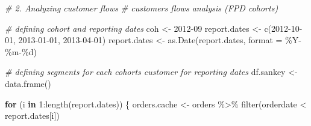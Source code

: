 \documentclass[
]{book}
\newenvironment{Shaded}{\begin{snugshade}}{\end{snugshade}}
\newcommand{\AttributeTok}[1]{\textcolor[rgb]{0.77,0.63,0.00}{#1}}
\newcommand{\CommentTok}[1]{\textcolor[rgb]{0.56,0.35,0.01}{\textit{#1}}}
\newcommand{\ControlFlowTok}[1]{\textcolor[rgb]{0.13,0.29,0.53}{\textbf{#1}}}
\newcommand{\DecValTok}[1]{\textcolor[rgb]{0.00,0.00,0.81}{#1}}
\newcommand{\FunctionTok}[1]{\textcolor[rgb]{0.00,0.00,0.00}{#1}}
\newcommand{\NormalTok}[1]{#1}
\newcommand{\OtherTok}[1]{\textcolor[rgb]{0.56,0.35,0.01}{#1}}
\newcommand{\SpecialCharTok}[1]{\textcolor[rgb]{0.00,0.00,0.00}{#1}}
\newcommand{\StringTok}[1]{\textcolor[rgb]{0.31,0.60,0.02}{#1}}
\begin{document}
\begin{Shaded}
\begin{Highlighting}[]
\CommentTok{\# 2. Analyzing customer flows}
\CommentTok{\# customers flows analysis (FPD cohorts)}

\CommentTok{\# defining cohort and reporting dates}
\NormalTok{coh }\OtherTok{\textless{}{-}} \StringTok{\textquotesingle{}2012{-}09\textquotesingle{}}
\NormalTok{report.dates }\OtherTok{\textless{}{-}} \FunctionTok{c}\NormalTok{(}\StringTok{\textquotesingle{}2012{-}10{-}01\textquotesingle{}}\NormalTok{, }\StringTok{\textquotesingle{}2013{-}01{-}01\textquotesingle{}}\NormalTok{, }\StringTok{\textquotesingle{}2013{-}04{-}01\textquotesingle{}}\NormalTok{)}
\NormalTok{report.dates }\OtherTok{\textless{}{-}} \FunctionTok{as.Date}\NormalTok{(report.dates, }\AttributeTok{format =} \StringTok{\textquotesingle{}\%Y{-}\%m{-}\%d\textquotesingle{}}\NormalTok{)}

\CommentTok{\# defining segments for each cohort\textquotesingle{}s customer for reporting dates}
\NormalTok{df.sankey }\OtherTok{\textless{}{-}} \FunctionTok{data.frame}\NormalTok{()}

\ControlFlowTok{for}\NormalTok{ (i }\ControlFlowTok{in} \DecValTok{1}\SpecialCharTok{:}\FunctionTok{length}\NormalTok{(report.dates)) \{}
\NormalTok{    orders.cache }\OtherTok{\textless{}{-}}\NormalTok{ orders }\SpecialCharTok{\%\textgreater{}\%}
        \FunctionTok{filter}\NormalTok{(orderdate }\SpecialCharTok{\textless{}}\NormalTok{ report.dates[i])}
    

\end{Highlighting}
\end{Shaded}
\end{document}
